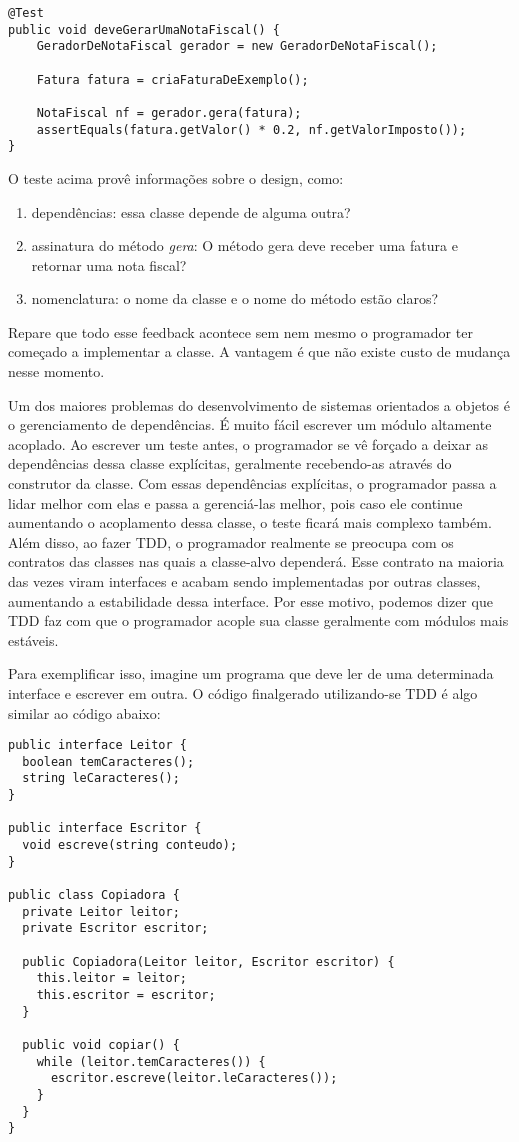 \begin{lstlisting}[frame=trbl]
@Test
public void deveGerarUmaNotaFiscal() {
	GeradorDeNotaFiscal gerador = new GeradorDeNotaFiscal();
	
	Fatura fatura = criaFaturaDeExemplo();
	
	NotaFiscal nf = gerador.gera(fatura);
	assertEquals(fatura.getValor() * 0.2, nf.getValorImposto());
}
\end{lstlisting}

O teste acima provê informações sobre o design, como:

\begin{enumerate}
	\item dependências: essa classe depende de alguma outra?
	\item assinatura do método \textit{gera}: O método gera deve receber uma fatura e retornar uma nota fiscal?
	\item nomenclatura: o nome da classe e o nome do método estão claros?
\end{enumerate}

Repare que todo esse feedback acontece sem nem mesmo o programador ter começado a implementar a classe. A vantagem é que
não existe custo de mudança nesse momento.

Um dos maiores problemas do desenvolvimento de sistemas orientados a objetos é o gerenciamento de dependências. É muito fácil
escrever um módulo altamente acoplado.
Ao escrever um teste antes, o programador se vê forçado a deixar as dependências dessa classe explícitas, 
geralmente recebendo-as através do construtor da classe. Com essas dependências explícitas, o programador passa a lidar 
melhor com elas e passa a gerenciá-las melhor, pois caso ele continue aumentando o acoplamento dessa classe, o teste ficará
mais complexo também. Além disso, ao fazer TDD, o programador realmente se preocupa com os contratos das classes nas quais
a classe-alvo dependerá. Esse contrato na maioria das vezes viram interfaces e acabam sendo implementadas por outras classes,
aumentando a estabilidade dessa interface. Por esse motivo, podemos dizer que TDD faz com que o programador acople sua classe
geralmente com módulos mais estáveis. 

Para exemplificar isso, imagine um programa que deve ler de uma determinada interface e escrever em outra. O código finalgerado 
utilizando-se TDD é algo similar ao código abaixo:

\begin{lstlisting}[frame=trbl]
public interface Leitor {
  boolean temCaracteres();
  string leCaracteres();
}

public interface Escritor {
  void escreve(string conteudo);
}

public class Copiadora {
  private Leitor leitor;
  private Escritor escritor;

  public Copiadora(Leitor leitor, Escritor escritor) {
    this.leitor = leitor;
    this.escritor = escritor;
  }

  public void copiar() {
    while (leitor.temCaracteres()) {
      escritor.escreve(leitor.leCaracteres());
    }
  }
}
\end{lstlisting}

